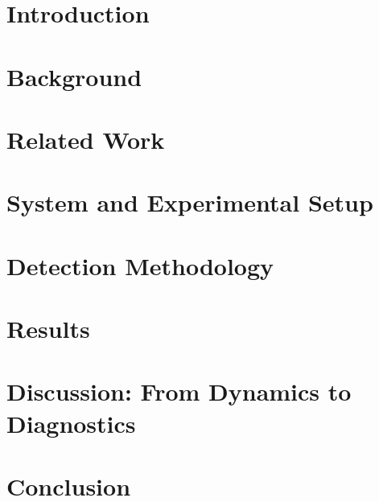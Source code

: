 \documentclass[12pt]{article}
\begin{document}
\newpage

  
\section{Introduction}
\label{sec:introduction}

\newpage

\section{Background}
\label{sec:infsub}

\newpage

\section{Related Work}
\label{sec:related}

\newpage

\section{System and Experimental Setup}
\label{sec:exp}

\newpage

\section{Detection Methodology}
\label{sec:method}

\newpage

\section{Results}
\label{sec:results}

\newpage

\section{Discussion: From Dynamics to Diagnostics}
\label{sec:discussion}

\newpage

\section{Conclusion}
\label{sec:conclusion}


\newpage

\begingroup
\RaggedRight
{}
{}


\endgroup
\newpage
\end{document}
